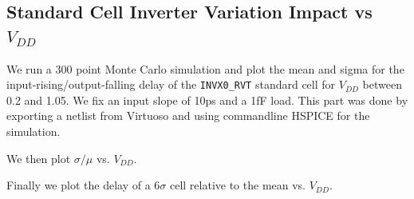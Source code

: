 \documentclass[11pt]{article}
\begin{document}
\subsection{Standard Cell Inverter Variation Impact vs $V_{DD}$}
We run a 300 point Monte Carlo simulation and plot the mean and sigma for the input-rising/output-falling delay of the \verb|INVX0_RVT| standard cell for $V_{DD}$ between 0.2 and 1.05. We fix an input slope of 10ps and a 1fF load. This part was done by exporting a netlist from Virtuoso and using commandline HSPICE for the simulation.

We then plot $\sigma / \mu$ vs. $V_{DD}$.

Finally we plot the delay of a $6 \sigma$ cell relative to the mean vs. $V_{DD}$.

\newpage
\appendix
\end{document}
